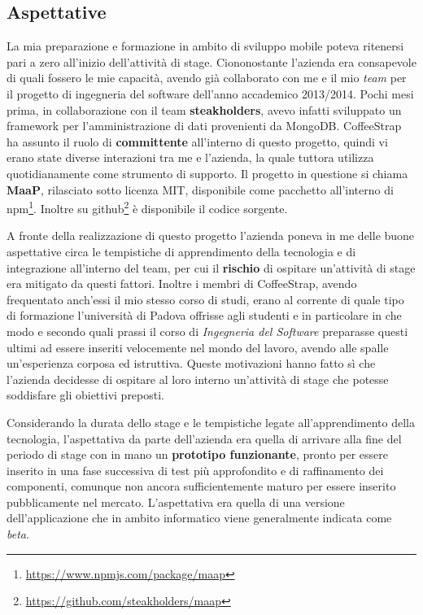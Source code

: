 \subsection{Aspettative}

La mia preparazione e formazione in ambito di sviluppo mobile poteva ritenersi pari a zero all'inizio dell'attività di stage. Ciononostante l'azienda era consapevole di quali fossero le mie capacità, avendo già collaborato con me e il mio \textit{team} per il progetto di ingegneria del software dell'anno accademico 2013/2014. Pochi mesi prima, in collaborazione con il team \textbf{steakholders}, avevo infatti sviluppato un framework per l'amministrazione di dati provenienti da MongoDB. CoffeeStrap ha assunto il ruolo di \textbf{committente} all'interno di questo progetto, quindi vi erano state diverse interazioni tra me e l'azienda, la quale tuttora utilizza quotidianamente come strumento di supporto. Il progetto in questione si chiama \textbf{MaaP}, rilasciato sotto licenza MIT, disponibile come pacchetto all'interno di npm\footnote{\url{https://www.npmjs.com/package/maap}}. Inoltre su github\footnote{\url{https://github.com/steakholders/maap}} è disponibile il codice sorgente.

A fronte della realizzazione di questo progetto l'azienda poneva in me delle buone aspettative circa le tempistiche di apprendimento della tecnologia e di integrazione all'interno del team, per cui il \textbf{rischio} di ospitare un'attività di stage era mitigato da questi fattori. Inoltre i membri di CoffeeStrap, avendo frequentato anch'essi il mio stesso corso di studi, erano al corrente di quale tipo di formazione l'università di Padova offrisse agli studenti e in particolare in che modo e secondo quali prassi il corso di \textit{Ingegneria del Software} preparasse questi ultimi ad essere inseriti velocemente nel mondo del lavoro, avendo alle spalle un'esperienza corposa ed istruttiva. Queste motivazioni hanno fatto sì che l'azienda decidesse di ospitare al loro interno un'attività di stage che potesse soddisfare gli obiettivi preposti. 

Considerando la durata dello stage e le tempistiche legate all'apprendimento della tecnologia, l'aspettativa da parte dell'azienda era quella di arrivare alla fine del periodo di stage con in mano un \textbf{prototipo funzionante}, pronto per essere inserito in una fase successiva di test più approfondito e di raffinamento dei componenti, comunque non ancora sufficientemente maturo per essere inserito pubblicamente nel mercato. L'aspettativa era quella di una versione dell'applicazione che in ambito informatico viene generalmente indicata come \textit{beta}.

